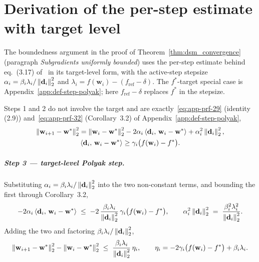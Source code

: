 \chapter{Derivation of the per-step estimate with target level}
\label{app:def-step-target}

The boundedness argument in the proof of Theorem~\ref{thm:dsm_convergence} (paragraph \emph{Subgradients uniformly bounded}) uses the per-step estimate behind eq.~(3.17) of~\cite{dantonio2009deflected} in its target-level form, with the active-step stepsize $\alpha_i = \beta_i\lambda_i/\left\lVert \mathbf{d}_i \right\rVert_2^2$ and $\lambda_i = f(\mathbf{w}_i)-(f_{\mathrm{ref}}-\delta)$. The $f^*$-target special case is Appendix~\ref{app:def-step-polyak}; here $f_{\mathrm{ref}}-\delta$ replaces $f^*$ in the stepsize.

Steps 1 and 2 do not involve the target and are exactly~\eqref{eq:app-prf-29} (identity (2.9)) and~\eqref{eq:app-prf-32} (Corollary~3.2) of Appendix~\ref{app:def-step-polyak},
\begin{gather*}
\left\lVert \mathbf{w}_{i+1}-\mathbf{w}^* \right\rVert_2^2 = \left\lVert \mathbf{w}_i-\mathbf{w}^* \right\rVert_2^2 - 2\alpha_i\left\langle \mathbf{d}_i,\, \mathbf{w}_i-\mathbf{w}^* \right\rangle + \alpha_i^2\left\lVert \mathbf{d}_i \right\rVert_2^2,\\
\left\langle \mathbf{d}_i,\, \mathbf{w}_i-\mathbf{w}^* \right\rangle\ge\gamma_i\big(f(\mathbf{w}_i)-f^*\big).
\end{gather*}

\paragraph{Step 3 --- target-level Polyak step.} Substituting $\alpha_i = \beta_i\lambda_i/\left\lVert \mathbf{d}_i \right\rVert_2^2$ into the two non-constant terms, and bounding the first through Corollary~3.2,
\[
-2\alpha_i\left\langle \mathbf{d}_i,\, \mathbf{w}_i-\mathbf{w}^* \right\rangle \;\le\; -2\,\frac{\beta_i\lambda_i}{\left\lVert \mathbf{d}_i \right\rVert_2^2}\,\gamma_i\big(f(\mathbf{w}_i)-f^*\big), \qquad \alpha_i^2\left\lVert \mathbf{d}_i \right\rVert_2^2 \;=\; \frac{\beta_i^2\lambda_i^2}{\left\lVert \mathbf{d}_i \right\rVert_2^2}.
\]
Adding the two and factoring $\beta_i\lambda_i/\left\lVert \mathbf{d}_i \right\rVert_2^2$,
\begin{equation}\label{eq:app-target-eta}
\left\lVert \mathbf{w}_{i+1}-\mathbf{w}^* \right\rVert_2^2 - \left\lVert \mathbf{w}_i-\mathbf{w}^* \right\rVert_2^2 \;\le\; \frac{\beta_i\lambda_i}{\left\lVert \mathbf{d}_i \right\rVert_2^2}\,\eta_i, \qquad \eta_i = -2\gamma_i\big(f(\mathbf{w}_i)-f^*\big)+\beta_i\lambda_i .
\end{equation}

